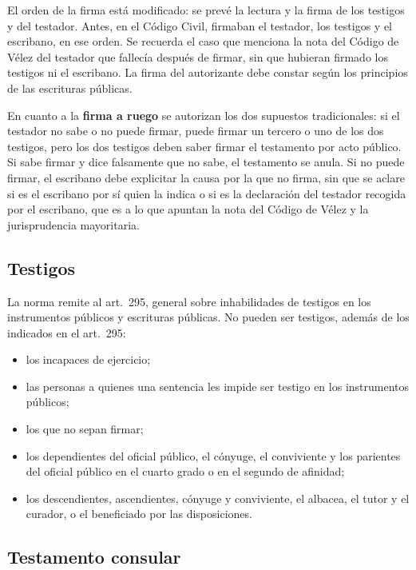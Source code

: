 \documentclass[12pt,oneside]{book}
\begin{document}
El orden de la firma está modificado: se prevé la lectura y la firma de los testigos y del testador. Antes, en el Código Civil, firmaban el testador, los testigos y el escribano, en ese orden. Se recuerda el caso que menciona la nota del Código de Vélez del testador que fallecía después de firmar, sin que hubieran firmado los testigos ni el escribano. La firma del autorizante debe constar según los principios de las escrituras públicas.

En cuanto a la \textbf{firma a ruego} se autorizan los dos supuestos tradicionales: si el testador no sabe o no puede firmar, puede firmar un tercero o uno de los dos testigos, pero los dos testigos deben saber firmar el testamento por acto público. Si sabe firmar y dice falsamente que no sabe, el testamento se anula. Si no puede firmar, el escribano debe explicitar la causa por la que no firma, sin que se aclare si es el escribano por sí quien la indica o si es la declaración del testador recogida por el escribano, que es a lo que apuntan la nota del Código de Vélez y la jurisprudencia mayoritaria.

\subsection{Testigos}

La norma remite al art.~295, general sobre inhabilidades de testigos en los instrumentos públicos y escrituras públicas. No pueden ser testigos, además de los indicados en el art.~295:

\begin{itemize}
    \item los incapaces de ejercicio;
    \item las personas a quienes una sentencia les impide ser testigo en los instrumentos públicos;
    \item los que no sepan firmar;
    \item los dependientes del oficial público, el cónyuge, el conviviente y los parientes del oficial público en el cuarto grado o en el segundo de afinidad;
    \item los descendientes, ascendientes, cónyuge y conviviente, el albacea, el tutor y el curador, o el beneficiado por las disposiciones.
\end{itemize}

\subsection{Testamento consular}
\end{document}
